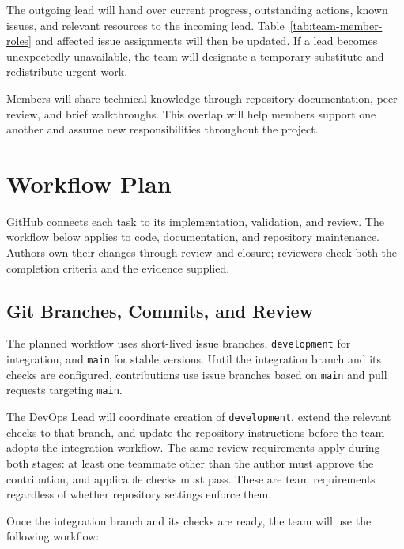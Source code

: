 \documentclass{article}
\begin{document}
The outgoing lead will hand over current progress, outstanding actions,
known issues, and relevant resources to the incoming lead.
Table~\ref{tab:team-member-roles} and affected issue assignments will
then be updated. If a lead becomes unexpectedly unavailable, the team
will designate a temporary substitute and redistribute urgent work.

Members will share technical knowledge through repository documentation,
peer review, and brief walkthroughs. This overlap will help members
support one another and assume new responsibilities throughout the
project.

\section{Workflow Plan}

\label{sec:workflow-plan}

GitHub connects each task to its implementation, validation, and review.
The workflow below applies to code, documentation, and repository maintenance.
Authors own their changes through review and closure; reviewers check both
the completion criteria and the evidence supplied.

\subsection{Git Branches, Commits, and Review}

The planned workflow uses short-lived issue branches,
\texttt{development} for integration, and \texttt{main} for stable
versions. Until the integration branch and its checks are configured,
contributions use issue branches based on \texttt{main} and pull
requests targeting \texttt{main}.

The DevOps Lead will coordinate creation of \texttt{development},
extend the relevant checks to that branch, and update the repository
instructions before the team adopts the integration workflow.
The same review requirements apply during both stages: at least
one teammate other than the author must approve the contribution,
and applicable checks must pass. These are team requirements
regardless of whether repository settings enforce them.

Once the integration branch and its checks are ready, the team
will use the following workflow:
\end{document}
